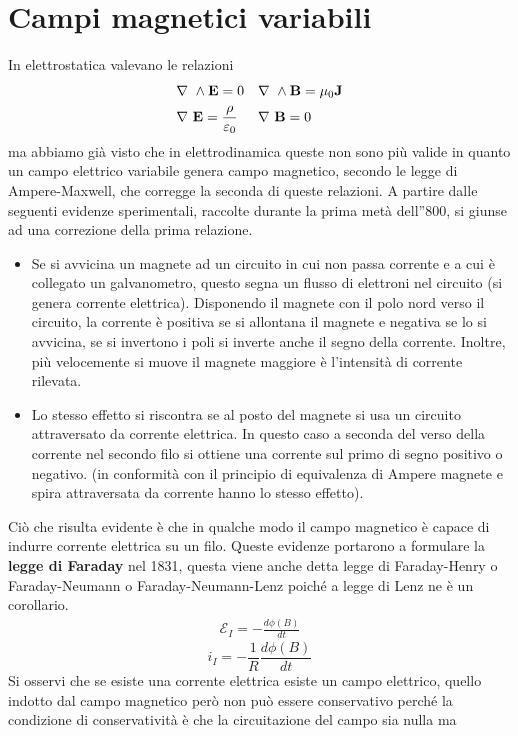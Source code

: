\documentclass[
10pt, %
a4paper, %
oneside, %
headinclude,footinclude, %
BCOR5mm, %
]{scrartcl}
\begin{document}
\section{Campi magnetici variabili}
In elettrostatica valevano le relazioni
\begin{align*}
&\nabla\ \wedge\mathbf{E}=0&&\nabla\ \wedge\mathbf{B}=\mu_0\mathbf{J}\\
&\nabla\ \mathbf{E}=\frac{\rho}{\varepsilon_0}&&\nabla\ \mathbf{B}=0
\end{align*}
ma abbiamo già visto che in elettrodinamica queste non sono più valide in quanto un campo elettrico variabile genera campo magnetico, secondo le legge di Ampere-Maxwell, che corregge la seconda di queste relazioni. A partire dalle seguenti evidenze sperimentali, raccolte durante la prima metà dell''800, si giunse ad una correzione della prima relazione.\\
\begin{itemize}
	\item Se si avvicina un magnete ad un circuito in cui non passa corrente e a cui è collegato un galvanometro, questo segna un flusso di elettroni nel circuito (si genera corrente elettrica). Disponendo il magnete con il polo nord verso il circuito, la corrente è positiva se si allontana il magnete e negativa se lo si avvicina, se si invertono i poli si inverte anche il segno della corrente. Inoltre, più velocemente si muove il magnete maggiore è l'intensità di corrente rilevata.
	\item Lo stesso effetto si riscontra se al posto del magnete si usa un circuito attraversato da corrente elettrica. In questo caso a seconda del verso della corrente nel secondo filo si ottiene una corrente sul primo di segno positivo o negativo. (in conformità con il principio di equivalenza di Ampere magnete e spira attraversata da corrente hanno lo stesso effetto).
\end{itemize}
Ciò che risulta evidente è che in qualche modo il campo magnetico è capace di indurre corrente elettrica su un filo. Queste evidenze portarono a formulare la \textbf{legge di Faraday} nel 1831, questa viene anche detta legge di Faraday-Henry o Faraday-Neumann o Faraday-Neumann-Lenz poiché a legge di Lenz ne è un corollario.
\begin{align}\label{eq:Faraday_integrale}
	\mathcal{E}_I = -\frac{d\phi(B)}{dt}
\end{align}
\[i_I = -\frac{1}{R}\frac{d\phi(B)}{dt}\]
Si osservi che se esiste una corrente elettrica esiste un campo elettrico, quello indotto dal campo magnetico però non può essere conservativo perché la condizione di conservatività è che la circuitazione del campo sia nulla ma
\end{document}
